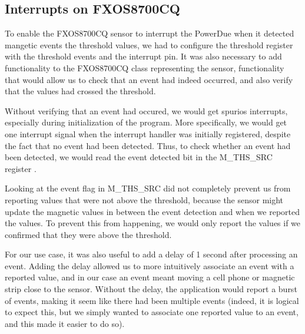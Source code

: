 

\subsection{Interrupts on FXOS8700CQ}
\label{sec:sensor_int}

To enable the FXOS8700CQ sensor to interrupt the PowerDue when it detected
mangetic events the threshold values, we had to configure the threshold register
\cite{DatasheetSPI} with the threshold events and the interrupt pin. It was also
necessary to add functionality to the FXOS8700CQ class representing the sensor,
functionality that would allow us to check that an event had indeed occurred,
and also verify that the values had crossed the threshold.

Without verifying that an event had occured, we would get spurios interrupts,
especially during initialization of the program. More specifically, we would get
one interrupt signal when the interrupt handler was initially registered,
despite the fact that no event had been detected. Thus, to check whether an
event had been detected, we would read the event detected bit in the M\_THS\_SRC
register \cite{DatasheetSPI}.

Looking at the event flag in M\_THS\_SRC did not completely prevent us from
reporting values that were not above the threshold, because the sensor
might update the magnetic values in between the event detection and when we
reported the values. To prevent this from happening, we would only report the
values if we confirmed that they were above the threshold.

For our use case, it was also useful to add a delay of 1 second after processing
an event. Adding the delay allowed us to more intuitively associate an event
with a reported value, and in our case an event meant moving a cell phone or
magnetic strip close to the sensor. Without the delay, the application would
report a burst of events, making it seem like there had been multiple events
(indeed, it is logical to expect this, but we simply wanted to associate one
reported value to an event, and this made it easier to do so).
